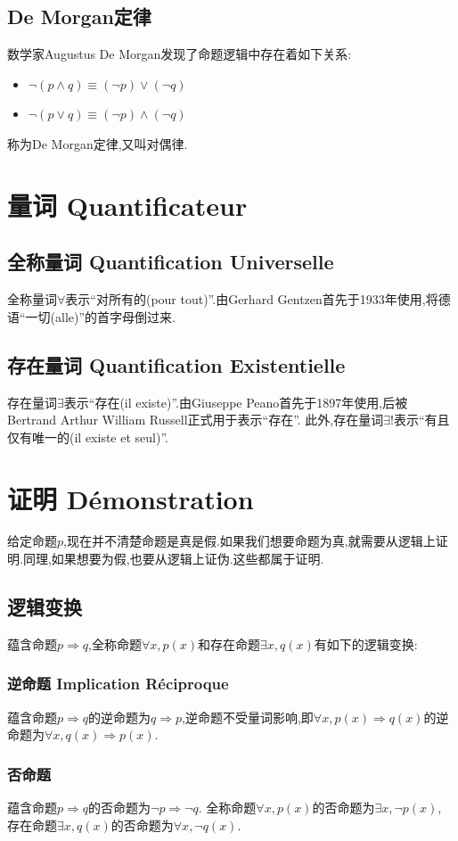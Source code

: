 \documentclass[12pt, a4paper, oneside]{ctexbook}
\begin{document}
  \subsection{De Morgan定律}
  数学家Augustus De Morgan发现了命题逻辑中存在着如下关系:
  \begin{itemize}
    \item $\lnot (p\wedge q)\equiv (\lnot p)\vee (\lnot q) $
    \item $\lnot (p\vee q)\equiv (\lnot p)\wedge (\lnot q) $
  \end{itemize}称为De Morgan定律,又叫对偶律.

  \section{量词 Quantificateur}
  \subsection{全称量词 Quantification Universelle}
  全称量词$\forall$表示“对所有的(pour tout)”.由Gerhard Gentzen首先于1933年使用,将德语“一切(alle)”的首字母倒过来.

  \subsection{存在量词 Quantification Existentielle}
  存在量词$\exists$表示“存在(il existe)”.由Giuseppe Peano首先于1897年使用,后被Bertrand Arthur William Russell正式用于表示“存在”.
  此外,存在量词$\exists !$表示“有且仅有唯一的(il existe et seul)”.


  \section{证明 Démonstration}
  给定命题$p$,现在并不清楚命题是真是假.如果我们想要命题为真,就需要从逻辑上证明.同理,如果想要为假,也要从逻辑上证伪.这些都属于证明.
  \subsection{逻辑变换}
  蕴含命题$p\Rightarrow q$,全称命题$\forall x,p(x)$和存在命题$\exists x,q(x)$有如下的逻辑变换:
  \subsubsection{逆命题 Implication Réciproque}
  蕴含命题$p\Rightarrow q$的逆命题为$q\Rightarrow p$,逆命题不受量词影响,即$\forall x,p(x)\Rightarrow q(x)$的逆命题为$\forall x,q(x)\Rightarrow p(x)$.
  \subsubsection{否命题 }
  蕴含命题$p\Rightarrow q$的否命题为$\lnot p\Rightarrow \lnot q$.
  全称命题$\forall x,p(x)$的否命题为$\exists x,\lnot p(x)$,
  存在命题$\exists x,q(x)$的否命题为$\forall x,\lnot q(x)$.
\end{document}
